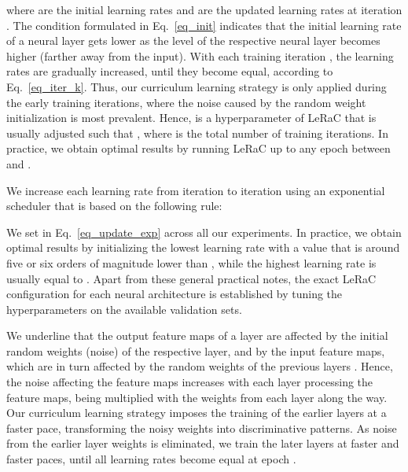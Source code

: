 \documentclass[10pt,twocolumn,letterpaper]{article}
\begin{document}
where  are the initial learning rates and  are the updated learning rates at iteration . The condition formulated in Eq.~\eqref{eq_init} indicates that the initial learning rate  of a neural layer  gets lower as the level of the respective neural layer becomes higher (farther away from the input). With each training iteration , the learning rates are gradually increased, until they become equal, according to Eq.~\eqref{eq_iter_k}. Thus, our curriculum learning strategy is only applied during the early training iterations, where the noise caused by the random weight initialization is most prevalent. Hence,  is a hyperparameter of LeRaC that is usually adjusted such that , where  is the total number of training iterations. In practice, we obtain optimal results by running LeRaC up to any epoch between  and .

We increase each learning rate  from iteration  to iteration  using an exponential scheduler that is based on the following rule:


We set  in Eq.~\eqref{eq_update_exp} across all our experiments.
In practice, we obtain optimal results by initializing the lowest learning rate  with a value that is around five or six orders of magnitude lower than , while the highest learning rate  is usually equal to . Apart from these general practical notes, the exact LeRaC configuration for each neural architecture is established by tuning the hyperparameters on the available validation sets.

We underline that the output feature maps of a layer  are affected  by the initial random weights (noise)  of the respective layer, and  by the input feature maps, which are in turn affected by the random weights of the previous layers . Hence, the noise affecting the feature maps increases with each layer processing the feature maps, being multiplied with the weights from each layer along the way. Our curriculum learning strategy imposes the training of the earlier layers at a faster pace, transforming the noisy weights into discriminative patterns. As noise from the earlier layer weights is eliminated, we train the later layers at faster and faster paces, until all learning rates become equal at epoch .
\end{document}
